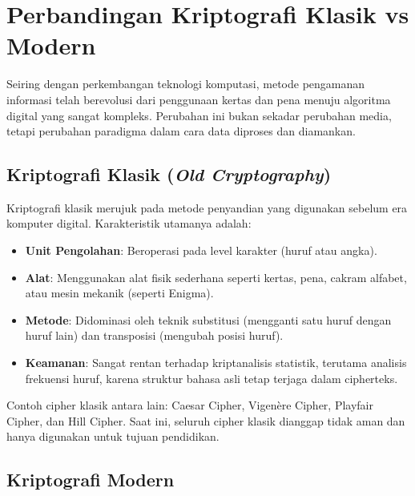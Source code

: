 \section{Perbandingan Kriptografi Klasik vs Modern}

Seiring dengan perkembangan teknologi komputasi, metode pengamanan informasi telah berevolusi dari penggunaan kertas dan pena menuju algoritma digital yang sangat kompleks. Perubahan ini bukan sekadar perubahan media, tetapi perubahan paradigma dalam cara data diproses dan diamankan.

\subsection{Kriptografi Klasik (\textit{Old Cryptography})}

Kriptografi klasik merujuk pada metode penyandian yang digunakan sebelum era komputer digital. Karakteristik utamanya adalah:
\begin{itemize}
    \item \textbf{Unit Pengolahan}: Beroperasi pada level karakter (huruf atau angka).
    \item \textbf{Alat}: Menggunakan alat fisik sederhana seperti kertas, pena, cakram alfabet, atau mesin mekanik (seperti Enigma).
    \item \textbf{Metode}: Didominasi oleh teknik substitusi (mengganti satu huruf dengan huruf lain) dan transposisi (mengubah posisi huruf).
    \item \textbf{Keamanan}: Sangat rentan terhadap kriptanalisis statistik, terutama analisis frekuensi huruf, karena struktur bahasa asli tetap terjaga dalam cipherteks.
\end{itemize}

Contoh cipher klasik antara lain: Caesar Cipher, Vigenère Cipher, Playfair Cipher, dan Hill Cipher. Saat ini, seluruh cipher klasik dianggap tidak aman dan hanya digunakan untuk tujuan pendidikan.

\subsection{Kriptografi Modern}

